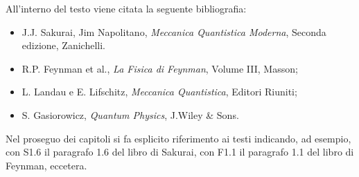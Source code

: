 \newpage
\setcounter{page}{3}
\facciatabianca
\thispagestyle{empty}
\setcounter{page}{3}
\begin{center}
\end{center}
All'interno del testo viene citata la seguente bibliografia:
\begin{itemize}
\item J.J. Sakurai, Jim Napolitano, \textit{Meccanica Quantistica Moderna}, Seconda edizione, Zanichelli.
\item R.P. Feynman et al., \textit{La Fisica di Feynman}, Volume III, Masson;
\item L. Landau e E. Lifschitz, \textit{Meccanica Quantistica}, Editori Riuniti;
\item S. Gasiorowicz, \textit{Quantum Physics}, J.Wiley \& Sons.
\end{itemize}
Nel proseguo dei capitoli si fa esplicito riferimento ai testi indicando, ad esempio, con S1.6 il paragrafo
1.6 del libro di Sakurai, con F1.1 il paragrafo 1.1 del libro di Feynman, eccetera.
\newpage
\setcounter{page}{3}
\facciatabianca
